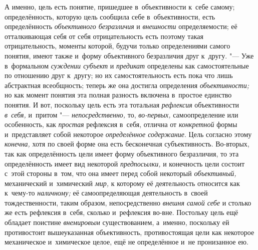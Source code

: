 А именно, цель есть понятие, пришедшее в~объективности к~себе
самому; определённость, которую цель сообщила себе в~объективности, есть
определённость {\em объективного безразличия} и {\em внешности}
определяемости; её отталкивающая себя от себя отрицательность
есть поэтому такая отрицательность, моменты которой, будучи только
определениями самого понятия, имеют также и~форму объективного безразличия
друг к~другу. "--- Уже в~формальном
{\em суждении субъект} и {\em предикат} определены
как самостоятельные по отношению друг к~другу; но их самостоятельность есть
пока что лишь абстрактная всеобщность; теперь же она достигла определения
{\em объективности;} но
как момент понятия эта полная разность включена в~простое единство понятия.
И вот, поскольку цель есть эта тотальная {\em рефлексия}
объективности {\em в~себя,} и~притом "--- {\em непосредственно,}
то, {\em во-первых,} самоопределение или особенность, как
{\em простая} рефлексия в~себя, отлична от {\em конкретной}
формы и~представляет собой некоторое {\em определённое содержание}.
Цель согласно этому {\em конечна,} хотя по
своей форме она есть бесконечная субъективность. Во-вторых, так как
определённость цели имеет форму объективного безразличия, то эта
определённость имеет вид некоторой {\em предпосылки,} и
конечность цели состоит с~этой стороны в~том, что она имеет перед собой
некоторый {\em объективный,} механический и~химический {\em мир,}
к которому её деятельность относится как к~чему-то {\em наличному;} её
самоопределяющая деятельность в~своей тождественности, таким образом,
непосредственно {\em внешня самой себе}
и столько же есть рефлексия в~себя, сколько и~рефлексия
во-вне. Постольку цель ещё обладает поистине {\em внемировым}
существованием, а~именно, поскольку ей противостоит вышеуказанная
объективность, противостоящая цели как некоторое механическое и~химическое
целое, ещё не определённое и~не пронизанное ею.

